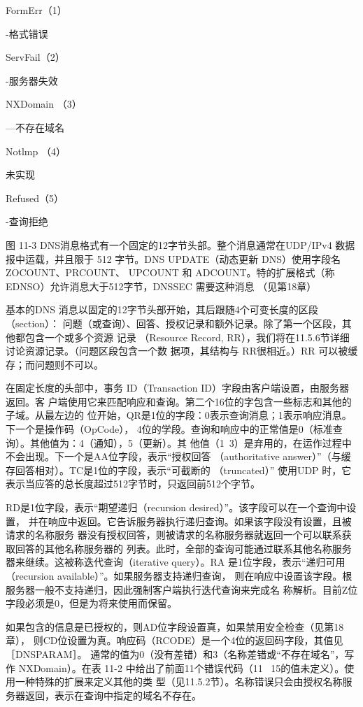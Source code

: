 FormErr（1）

-格式错误

ServFail（2）

-服务器失效

NXDomain （3）

—不存在域名

Notlmp （4）

未实现

Refused（5）

-查询拒绝

图 11-3
DNS消息格式有一个固定的12字节头部。整个消息通常在UDP/IPv4 数据报中运载，并且限于
512 字节。DNS UPDATE（动态更新 DNS）使用字段名 ZOCOUNT、PRCOUNT、 UPCOUNT 和
ADCOUNT。特的扩展格式（称 EDNSO）允许消息大于512字节，DNSSEC 需要这种消息
（见第18章）

基本的DNS 消息以固定的12字节头部开始，其后跟随4个可变长度的区段（section）：
问题（或查询）、回答、授权记录和额外记录。除了第一个区段，其他都包含一个或多个资源
记录 （Resource Record, RR），我们将在11.5.6节详细讨论资源记录。（问题区段包含一个数
据项，其结构与 RR很相近。）RR 可以被缓存；而问题则不可以。

在固定长度的头部中，事务 ID（Transaction ID）字段由客户端设置，由服务器返回。客
户端使用它来匹配响应和查询。第二个16位的字包含一些标志和其他的子域。从最左边的
位开始，QR是1位的字段：0表示查询消息；1表示响应消息。下一个是操作码（OpCode），
4位的学段。查询和响应中的正常值是0（标准查询）。其他值为：4（通知），5（更新）。其
他值（1~3）是弃用的，在运作过程中不会出现。下一个是AA位字段，表示“授权回答
（authoritative answer）”（与缓存回答相对）。TC是1位的字段，表示“可截断的 （truncated）”
使用UDP 时，它表示当应答的总长度超过512字节时，只返回前512个字节。

RD是1位字段，表示“期望递归（recursion desired）”。该字段可以在一个查询中设置，
并在响应中返回。它告诉服务器执行递归查询。如果该字段没有设置，且被请求的名称服务
器没有授权回答，则被请求的名称服务器就返回一个可以联系获取回答的其他名称服务器的
列表。此时，全部的查询可能通过联系其他名称服务器来继续。这被称迭代查询（iterative
query）。RA 是1位字段，表示“递归可用（recursion available）”。如果服务器支持递归查询，
则在响应中设置该字段。根服务器一般不支持递归，因此强制客户端执行迭代查询来完成名
称解析。目前Z位字段必须是0，但是为将来使用而保留。

如果包含的信息是已授权的，则AD位字段设置真，如果禁用安全检查（见第18章），
则CD位设置为真。响应码（RCODE）是一个4位的返回码字段，其值见 ［DNSPARAM］。
通常的值为0（没有差错）和3（名称差错或“不存在域名”，写作 NXDomain）。在表 11-2
中给出了前面11个错误代码（11 ~15的值未定义）。使用一种特殊的扩展来定义其他的类
型（见11.5.2节）。名称错误只会由授权名称服务器返回，表示在查询中指定的域名不存在。

